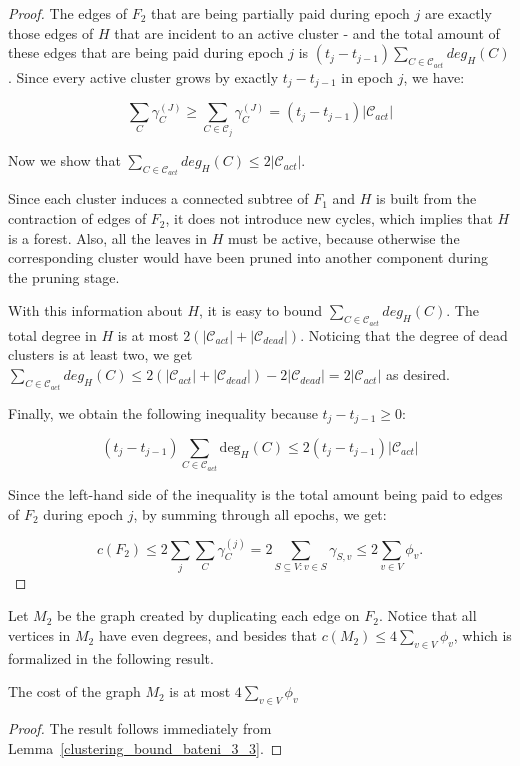 \begin{proof}
The edges of \(F_2\) that are being partially paid during epoch \(j\) are exactly those edges of \(H\) that are incident to an active cluster - and the total amount of these edges that are being paid during epoch \(j\) is \((t_j - t_{j - 1}) \sum_{C \in \mathcal{C}_{act}} deg_H(C)\). Since every active cluster grows by exactly \(t_j - t_{j - 1}\) in epoch \(j\), we have:

$$\sum_C \gamma_C^{(J)} \geq \sum_{C \in \mathcal{C}_j} \gamma_C^{(J)} = (t_j - t_{j - 1}) |\mathcal{C}_{act}|$$

Now we show that \(\sum_{C \in \mathcal{C}_{act}} deg_H(C) \leq 2|\mathcal{C}_{act}|\).

Since each cluster induces a connected subtree of \(F_1\) and \(H\) is built from the contraction of edges of \(F_2\), it does not introduce new cycles, which implies that \(H\) is a forest. 
Also, all the leaves in \(H\) must be active, because otherwise the corresponding cluster would have been pruned into another component during the pruning stage.

With this information about \(H\), it is easy to bound \(\sum_{C \in \mathcal{C}_{act}} deg_H(C)\). The total degree in \(H\) is at most \(2 (|\mathcal{C}_{act}| + |\mathcal{C}_{dead}|)\). Noticing that the degree of dead clusters is at least two, we get \(\sum_{C \in \mathcal{C}_{act}} deg_H(C) \leq 2 (|\mathcal{C}_{act}| + |\mathcal{C}_{dead}|) - 2|\mathcal{C}_{dead}| = 2|\mathcal{C}_{act}|\) as desired.

Finally, we obtain the following inequality because $t_j-t_{j-1} \ge 0$:

$$(t_j - t_{j - 1}) \sum_{C \in \mathcal{C}_{act}} \mathrm{deg}_H(C) \leq 2 (t_j - t_{j - 1}) |\mathcal{C}_{act}|$$

Since the left-hand side of the inequality is the total amount being paid to edges of \(F_2\) during epoch \(j\), by summing through all epochs, we get:

$$c (F_2) \leq 2 \sum_j \sum_C \gamma_C^{(j)} = 2 \sum_{S \subseteq V : v \in S} \gamma_{S, v} \leq 2 \sum_{v \in V} \phi_v.$$

\end{proof}

Let \(M_2\) be the graph created by duplicating each edge on \(F_2\). Notice that all vertices in \(M_2\) have even degrees, and besides that \(c(M_2) \leq 4 \sum_{v \in V} \phi_v\), which is formalized in the following result.

\begin{corollary} \label{corollary_1}
The cost of the graph \(M_2\) is at most \(4 \sum_{v \in V} \phi_v\)
\end{corollary}
\begin{proof}
    The result follows immediately from Lemma~\ref{clustering_bound_bateni_3_3}.
\end{proof}


